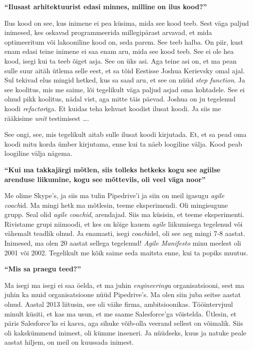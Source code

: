 \textbf{\enquote{Ilusast arhitektuurist edasi minnes, milline on ilus kood?}}

Ilus kood on see, kus inimene ei pea küsima, mida see kood teeb. Sest väga 
paljud inimesed, kes oskavad programmeerida millegipärast arvavad, et mida 
optimeeritum või lakooniline kood on, seda parem. See teeb halba. On piir, kust
enam edasi teine inimene ei saa enam aru, mida see kood teeb. See ei ole hea 
kood, isegi kui ta teeb õiget asja. See on üks asi. Aga teine asi on, et ma 
pean sulle suur aitäh ütlema selle eest, et sa tõid Eestisse Joshua 
Kerievsky omal ajal. Sul tekivad elus mingid hetked, kus sa saad aru, 
et see on nüüd \emph{step function}. Ja see koolitus, mis me saime, lõi 
tegelikult väga paljud asjad oma kohtadele. See ei olnud pikk koolitus, nädal 
vist, aga mitte täis päevad. Joshua on ju tegelenud koodi \emph{refactor}iga. 
Et kuidas teha kehvast koodist ilusat koodi. Ja siis me rääkisime \emph{unit} 
testimisest \ldots.

See ongi, see, mis tegelikult aitab sulle ilusat koodi kirjutada. Et, et sa 
pead oma koodi mitu korda ümber kirjutama, enne kui ta näeb loogiline välja. 
Kood peab loogiline välja nägema.

\textbf{\enquote{Kui ma takkajärgi mõtlen, siis tolleks hetkeks kogu see 
agiilse arenduse liikumine, kogu see mõtteviis, oli veel väga noor}}

Me olime Skype's, ja siis ma tulin Pipedrive'i ja siin on meil 
igasugu \emph{agile coach}id. Ma mingi hetk ma mõtlesin, teeme eksperimendi. 
Oli mingisugune grupp. Seal olid \emph{agile coachid}, arendajad. Siis ma 
küsisin, et teeme eksperimenti. Rivistame grupi niimoodi, et kes on kõige kauem 
\emph{agile} liikumisega tegelenud  või vähemalt teadlik olnud. Ja enamasti, 
isegi \emph{coach}idel, oli see aeg mingi 7-8 aastat. Inimesed, ma olen 20 
aastat sellega tegelenud! \emph{Agile Manifesto} minu meelest oli 2001 või 
2002. Tegelikult me kõik saime seda maitsta enne, kui ta popiks muutus.

\textbf{\enquote{Mis sa praegu teed?}}

Ma isegi ma isegi ei saa öelda, et ma juhin \emph{engineering}u 
organisatsiooni, sest ma juhin ka muid organisatsioone nüüd 
Pipedrive's. Ma olen siin juba seitse aastat olnud. Aastal 
2013 liitusin, see oli väike firma, ambitsioonikas. Tööintervjuul minult 
küsiti, et kas ma usun, et me saame Salesforce'ga võistelda. Ütlesin, et päris 
Salesforce'ks ei kasva, aga sihuke võib-olla veerand sellest on võimalik. Siis 
oli kakskümmend inimest, oli kümme inseneri. Ja nüüdseks, kuus ja natuke peale 
aastat hiljem, on meil on kuussada inimest.

